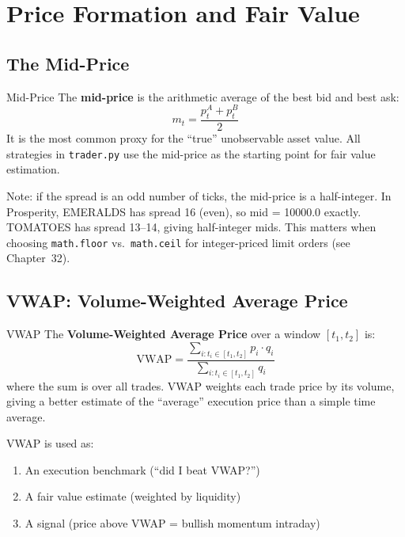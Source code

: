 \documentclass[12pt,a4paper,openany]{report}
\theoremstyle{definition}
\begin{document}

\chapter{Price Formation and Fair Value}

\section{The Mid-Price}

\begin{definitionbox}{Mid-Price}
The \textbf{mid-price} is the arithmetic average of the best bid and best ask:
\[
  m_t = \frac{p_t^A + p_t^B}{2}
\]
It is the most common proxy for the ``true'' unobservable asset value. All strategies in \texttt{trader.py} use the mid-price as the starting point for fair value estimation.
\end{definitionbox}

Note: if the spread is an odd number of ticks, the mid-price is a half-integer. In Prosperity, EMERALDS has spread 16 (even), so mid = 10000.0 exactly. TOMATOES has spread 13--14, giving half-integer mids. This matters when choosing \texttt{math.floor} vs.\ \texttt{math.ceil} for integer-priced limit orders (see Chapter~32).

\section{VWAP: Volume-Weighted Average Price}

\begin{definitionbox}{VWAP}
The \textbf{Volume-Weighted Average Price} over a window $[t_1, t_2]$ is:
\[
  \text{VWAP} = \frac{\sum_{i: t_i \in [t_1,t_2]} p_i \cdot q_i}{\sum_{i: t_i \in [t_1,t_2]} q_i}
\]
where the sum is over all trades. VWAP weights each trade price by its volume, giving a better estimate of the ``average'' execution price than a simple time average.
\end{definitionbox}

VWAP is used as:
\begin{enumerate}
  \item An execution benchmark (``did I beat VWAP?'')
  \item A fair value estimate (weighted by liquidity)
  \item A signal (price above VWAP = bullish momentum intraday)
\end{enumerate}
\end{document}
